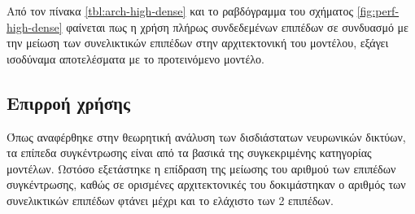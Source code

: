 
Από τον πίνακα \ref{tbl:arch-high-dense} και το ραβδόγραμμα του σχήματος \ref{fig:perf-high-dense} φαίνεται πως η χρήση πλήρως συνδεδεμένων επιπέδων σε συνδυασμό με την μείωση των συνελικτικών επιπέδων στην αρχιτεκτονική του μοντέλου, εξάγει ισοδύναμα αποτελέσματα με το προτεινόμενο μοντέλο.

\subsection{Επιρροή χρήσης }
Όπως αναφέρθηκε στην θεωρητική ανάλυση των δισδιάστατων νευρωνικών δικτύων, τα επίπεδα συγκέντρωσης είναι από τα βασικά της συγκεκριμένης κατηγορίας μοντέλων. Ωστόσο εξετάστηκε η επίδραση της μείωσης του αριθμού των επιπέδων συγκέντρωσης, καθώς σε ορισμένες αρχιτεκτονικές του δοκιμάστηκαν ο αριθμός των συνελικτικών επιπέδων φτάνει μέχρι και το ελάχιστο των 2 επιπέδων.


